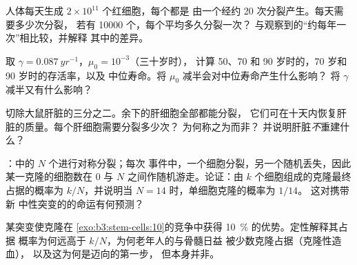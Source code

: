 \begin{exercise}[$\star\star$]\label{exo:b3:stem-cells:7}
人体每天生成 $2\times 10^{11}$ 个红细胞，每个都是
由一个经约 20 次分裂产生。每天需要多少次分裂，
若有 \num{10000} 个，每个平均多久分裂一次？
与观察到的“约每年一次”相比较，并解释
其中的差异。
\end{exercise}

\begin{exercise}[$\star\star$]\label{exo:b3:stem-cells:8}
取 $\gamma = \qty{0.087}{yr^{-1}}$，$\mu_{0} = 10^{-3}$（三十岁时），
计算 50、70 和 90 岁时的，70 岁和 90 岁时的存活率，以及
中位寿命。将 $\mu_{0}$ 减半会对中位寿命产生什么影响？
将 $\gamma$ 减半又有什么影响？
\end{exercise}

\begin{exercise}[$\star\star$]\label{exo:b3:stem-cells:9}
切除大鼠肝脏的三分之二。余下的肝细胞全部都能分裂，
它们可在十天内恢复肝脏的质量。每个肝细胞需要分裂多少次？
为何称之为而非？
并说明肝脏\emph{不}重建什么？
\end{exercise}

\begin{exercise}[$\star\star\star$]\label{exo:b3:stem-cells:10}
：中的 $N$ 个进行对称分裂；每次
事件中，一个细胞分裂，另一个随机丢失，因此某一克隆的细胞数在
$0$ 与 $N$ 之间作随机游走。论证：由
$k$ 个细胞组成的克隆最终占据的概率为
$k/N$，并说明当 $N = 14$ 时，单细胞克隆的概率为 $1/14$。
这对携带新
中性突变的的命运有何预测？
\end{exercise}

\begin{exercise}[$\star\star\star$]\label{exo:b3:stem-cells:11}
某突变使克隆在
\cref{exo:b3:stem-cells:10}的竞争中获得 \qty{10}{\%} 的优势。定性解释其占据
概率为何远高于 $k/N$，为何老年人的与骨髓日益
被少数克隆占据（克隆性造血），
以及这为何是迈向的第一步，
但本身并非。
\end{exercise}

